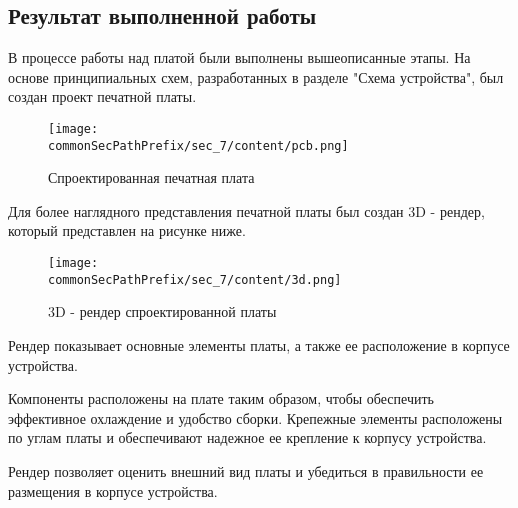 \subsection{Результат выполненной работы}

В процессе работы над платой были выполнены вышеописанные этапы. На основе принципиальных схем, разработанных в разделе "Схема устройства", был создан проект печатной платы.
\begin{figure}[ht]
    \centering
    \texttt{[image: \\commonSecPathPrefix/sec\_7/content/pcb.png]}
    \caption{Спроектированная печатная плата}
\end{figure}
Для более наглядного представления печатной платы был создан 3D - рендер, который представлен на рисунке ниже.
\begin{figure}[ht]
    \centering
    \texttt{[image: \\commonSecPathPrefix/sec\_7/content/3d.png]}
    \caption{3D - рендер спроектированной платы}
\end{figure}
Рендер показывает основные элементы платы, а также ее расположение в корпусе устройства.


Компоненты расположены на плате таким образом, чтобы обеспечить эффективное охлаждение и удобство сборки. Крепежные элементы расположены по углам платы и обеспечивают надежное ее крепление к корпусу устройства.


Рендер позволяет оценить внешний вид платы и убедиться в правильности ее размещения в корпусе устройства.